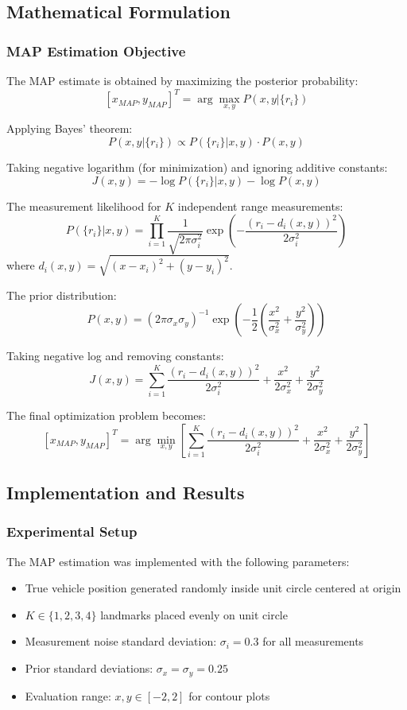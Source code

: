 \documentclass[12pt]{article}
\begin{document}
\subsection{Mathematical Formulation}

\subsubsection{MAP Estimation Objective}

The MAP estimate is obtained by maximizing the posterior probability:
\[
[x_{MAP}, y_{MAP}]^T = \arg \max_{x,y} P(x,y | \{r_i\})
\]

Applying Bayes' theorem:
\[
P(x,y | \{r_i\}) \propto P(\{r_i\} | x,y) \cdot P(x,y)
\]

Taking negative logarithm (for minimization) and ignoring additive constants:
\[
J(x,y) = -\log P(\{r_i\} | x,y) - \log P(x,y)
\]

The measurement likelihood for $K$ independent range measurements:
\[
P(\{r_i\} | x,y) = \prod_{i=1}^K \frac{1}{\sqrt{2\pi\sigma_i^2}} \exp\left(-\frac{(r_i - d_i(x,y))^2}{2\sigma_i^2}\right)
\]
where $d_i(x,y) = \sqrt{(x-x_i)^2 + (y-y_i)^2}$.

The prior distribution:
\[
P(x,y) = (2\pi\sigma_x\sigma_y)^{-1} \exp\left(-\frac{1}{2}\left(\frac{x^2}{\sigma_x^2} + \frac{y^2}{\sigma_y^2}\right)\right)
\]

Taking negative log and removing constants:
\[
J(x,y) = \sum_{i=1}^K \frac{(r_i - d_i(x,y))^2}{2\sigma_i^2} + \frac{x^2}{2\sigma_x^2} + \frac{y^2}{2\sigma_y^2}
\]

The final optimization problem becomes:
\[
\boxed{[x_{MAP}, y_{MAP}]^T = \arg \min_{x,y} \left[ \sum_{i=1}^K \frac{(r_i - d_i(x,y))^2}{2\sigma_i^2} + \frac{x^2}{2\sigma_x^2} + \frac{y^2}{2\sigma_y^2} \right]}
\]

\subsection{Implementation and Results}

\subsubsection{Experimental Setup}
The MAP estimation was implemented with the following parameters:
\begin{itemize}
    \item True vehicle position generated randomly inside unit circle centered at origin
    \item $K \in \{1, 2, 3, 4\}$ landmarks placed evenly on unit circle
    \item Measurement noise standard deviation: $\sigma_i = 0.3$ for all measurements
    \item Prior standard deviations: $\sigma_x = \sigma_y = 0.25$
    \item Evaluation range: $x,y \in [-2, 2]$ for contour plots
\end{itemize}
\end{document}
